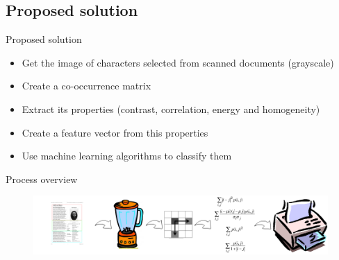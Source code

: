 \documentclass[notes]{beamer}
\begin{document}
\begin{frame}
\section{Proposed solution}
\begin{block}{Proposed solution}

\begin{itemize}

\item Get the image of characters selected from scanned documents (grayscale)

\item Create a co-occurrence matrix

\item Extract its properties (contrast, correlation, energy and homogeneity)

\item Create a feature vector from this properties

\item Use machine learning algorithms to classify them

\end{itemize}

\end{block}

\end{frame}

\begin{frame}

\begin{block}{Process overview}

\begin{figure}[!htb]
\centering
\includegraphics[scale=0.25]{process_flow}
\label{fig:process_overview}
\end{figure}

\end{block}

\end{frame}
\end{document}
